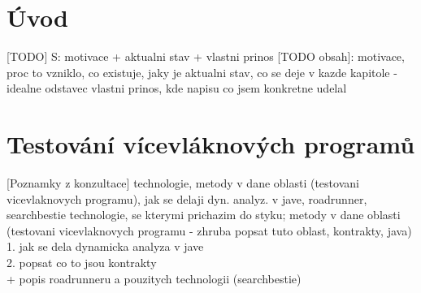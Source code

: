 
\chapter{Úvod}

[TODO] S: motivace + aktualni stav + vlastni prinos
[TODO obsah]: motivace, proc to vzniklo, co existuje, jaky je aktualni stav, co se deje v kazde kapitole
 - idealne odstavec vlastni prinos, kde napisu co jsem konkretne udelal 



\chapter{Testování vícevláknových programů}

[Poznamky z konzultace] technologie, metody v dane oblasti (testovani vicevlaknovych programu), jak se delaji dyn. analyz. v jave, roadrunner, searchbestie
technologie, se kterymi prichazim do styku; metody v dane oblasti (testovani vicevlaknovych programu - zhruba popsat tuto oblast, kontrakty, java)\\
1. jak se dela dynamicka analyza v jave\\
2. popsat co to jsou kontrakty\\
	+ popis roadrunneru a pouzitych technologii (searchbestie)\\

